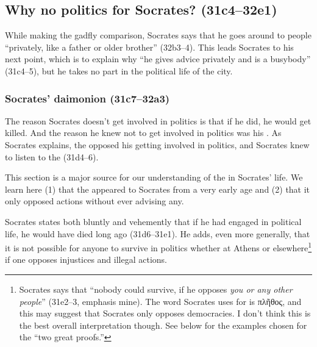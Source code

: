 \documentclass[11pt]{article}
\begin{document}

\subsection{Why no politics for Socrates? (31c4--32e1)}

While making the gadfly comparison, Socrates says that he goes around to people ``privately, like a father or older brother'' (32b3--4).  This leads Socrates to his next point, which is to explain why ``he gives advice privately and is a busybody'' (31c4--5), but he takes no part in the political life of the city.


\subsubsection{Socrates' daimonion (31c7--32a3)}

The reason Socrates doesn't get involved in politics is that if he did, he would get killed.  And the reason he knew not to get involved in politics was his .  As Socrates explains, the  opposed his getting involved in politics, and Socrates knew to listen to the  (31d4--6).

This section is a major source for our understanding of the  in Socrates' life.  We learn here (1) that the  appeared to Socrates from a very early age and (2) that it only opposed actions without ever advising any.

Socrates states both bluntly and vehemently that if he had engaged in political life, he would have died long ago (31d6--31e1).  He adds, even more generally, that it is not possible for anyone to survive in politics whether at Athens or elsewhere\footnote{Socrates says that ``nobody could survive, if he opposes \emph{you or any other people}'' (31e2--3, emphasis mine).  The word Socrates uses for  is {\g πλῆθος}, and this may suggest that Socrates only opposes democracies.  I don't think this is the best overall interpretation though.  See below for the examples chosen for the ``two great proofs.''} if one opposes injustices and illegal actions.


\end{document}
